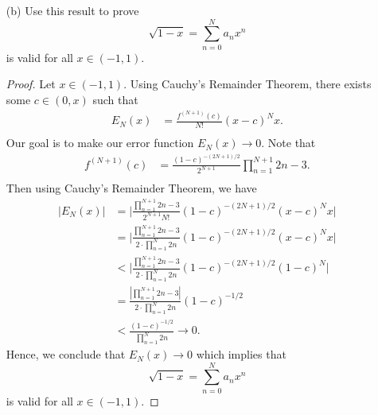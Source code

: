 \begin{enumerate}
    \item[(b)] Use this result to prove 
      \[  \sqrt{ 1-x } = \sum_{ n=0 }^{ N } a_{n} x^{n} \] 
        is valid for all \( x \in (-1,1) \).
        \begin{proof}
        Let \( x \in (-1,1) \). Using Cauchy's Remainder Theorem, there exists some \( c   \in (0,x) \) such that 
        \begin{align*}
           E_{N}(x) &= \frac{ f^{(N+1)}(c) }{ N! } (x-c)^{N} x.\\
        \end{align*}
        Our goal is to make our error function \( E_{N}(x) \to 0   \). Note that 
        \begin{align*}
            f^{(N+1)}(c) &= \frac{ (1-c)^{-(2N+1)/2} }{ 2^{N+1} } \prod_{n=1}^{N+1} 2n-3. \\
        \end{align*}
        Then using Cauchy's Remainder Theorem, we have 
        \begin{align*}
            | E_{N}(x) | &= \Big| \frac{ \prod_{n=1}^{N+1} 2n-3 }{ 2^{N+1} N! } (1-c)^{-(2N+1)/2} (x-c)^{N} x \Big|  \\
                         &= \Big| \frac{ \prod_{n=1}^{N+1} 2n-3 }{ 2 \cdot \prod_{n=1}^{N} 2n } (1-c)^{-(2N+1)/2} (x-c)^{N} x  \Big|  \\
                         &<  \Big| \frac{ \prod_{n=1}^{N+1} 2n-3 }{  2 \cdot \prod_{n=1}^{N} 2n } (1-c)^{-(2N+1)/2} (1-c)^{N} \Big| \\
                         &= \frac{ | \prod_{n=1}^{N+1} 2n-3 | }{  2 \cdot \prod_{n=1}^{N} 2n } (1-c)^{-1/2}  \\
                         &< \frac{ (1-c)^{-1/2} }{ \prod_{n=1}^{N} 2n } \to 0. 
        \end{align*}
        Hence, we conclude that \( E_{N}(x) \to 0  \) which implies that 
        \[  \sqrt{ 1-x } = \sum_{ n=0  }^{ N } a_{n} x^{n} \]
        is valid for all \( x \in (-1,1) \).
        \end{proof}
\end{enumerate}

